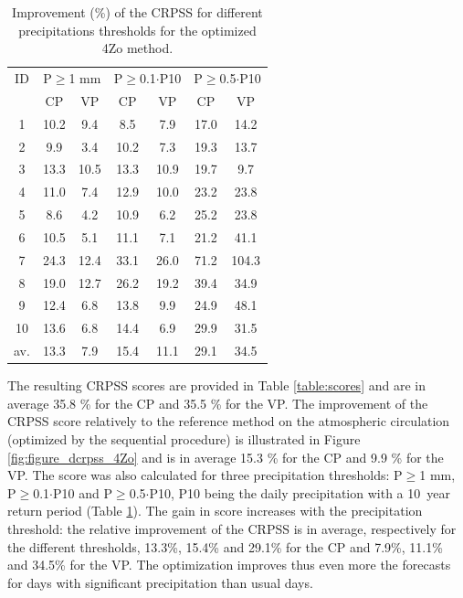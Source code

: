\documentclass[review]{elsarticle}
\begin{document}
\begin{table}[htb]
	\caption{Improvement (\%) of the CRPSS for different precipitations thresholds for the optimized 4Zo method.}
	\footnotesize
	\begin{center}
		\begin{tabular}{ccccccc}
			\hline 
			ID & \multicolumn{2}{c}{P\(\geq\)1 mm} & \multicolumn{2}{c}{P\(\geq\)0.1\(\cdot\)P10} & \multicolumn{2}{c}{P\(\geq\)0.5\(\cdot\)P10} \\ 
			& CP & VP & CP & VP & CP & VP \\ 
			\hline 
			1 & 10.2 & 9.4 & 8.5 & 7.9 & 17.0 & 14.2 \\ 
			2 & 9.9 & 3.4 & 10.2 & 7.3 & 19.3 & 13.7 \\ 
			3 & 13.3 & 10.5 & 13.3 & 10.9 & 19.7 & 9.7 \\ 
			4 & 11.0 & 7.4 & 12.9 & 10.0 & 23.2 & 23.8 \\ 
			5 & 8.6 & 4.2 & 10.9 & 6.2 & 25.2 & 23.8 \\ 
			6 & 10.5 & 5.1 & 11.1 & 7.1 & 21.2 & 41.1 \\ 
			7 & 24.3 & 12.4 & 33.1 & 26.0 & 71.2 & 104.3 \\ 
			8 & 19.0 & 12.7 & 26.2 & 19.2 & 39.4 & 34.9 \\ 
			9 & 12.4 & 6.8 & 13.8 & 9.9 & 24.9 & 48.1 \\ 
			10 & 13.6 & 6.8 & 14.4 & 6.9 & 29.9 & 31.5 \\ 
			\hline 
			av. & 13.3 & 7.9 & 15.4 & 11.1 & 29.1 & 34.5 \\ 
			\hline 
		\end{tabular} 
	\end{center}
	\label{table:scores_thresholds_4Zo}
\end{table}

The resulting CRPSS scores are provided in Table \ref{table:scores} and are in average 35.8 \% for the CP and 35.5 \% for the VP. The improvement of the CRPSS score relatively to the reference method on the atmospheric circulation (optimized by the sequential procedure) is illustrated in Figure \ref{fig:figure_dcrpss_4Zo} and is in average 15.3 \% for the CP and 9.9 \% for the VP. The score was also calculated for three precipitation thresholds: P\(\geq\)1 mm, P\(\geq\)0.1\(\cdot\)P10 and P\(\geq\)0.5\(\cdot\)P10, P10 being the daily precipitation with a 10~year return period (Table \ref{table:scores_thresholds_4Zo}). The gain in score increases with the precipitation threshold: the relative improvement of the CRPSS is in average, respectively for the different thresholds, 13.3\%, 15.4\% and 29.1\% for the CP and 7.9\%, 11.1\% and 34.5\% for the VP. The optimization improves thus even more the forecasts for days with significant precipitation than usual days.
\end{document}
